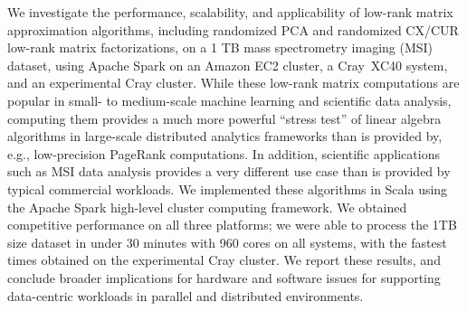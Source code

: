 We investigate the performance, scalability, and applicability of low-rank matrix approximation algorithms, including randomized PCA and randomized CX/CUR low-rank matrix factorizations, on a 1 TB mass spectrometry imaging (MSI) dataset, using Apache Spark on an Amazon EC2 cluster, a 
Cray\textregistered~XC40{\tiny\texttrademark} system, and an experimental Cray cluster.  
While these low-rank matrix computations are popular in small- to medium-scale machine learning and scientific data analysis, computing them provides a much more powerful ``stress test'' of linear algebra algorithms in large-scale distributed analytics frameworks than is provided by, e.g., low-precision PageRank computations.
In addition, scientific applications such as MSI data analysis provides a very different use case 
than is provided by typical commercial workloads.
We implemented these algorithms in Scala using the Apache Spark high-level cluster computing framework.  
We obtained competitive performance on all three platforms; we were able to process the 1TB size dataset in under 30 minutes with 960 cores on all systems, with the fastest times obtained on the experimental Cray cluster.
We report these results, and conclude broader implications for hardware and software issues for supporting data-centric workloads in parallel and distributed environments.  

